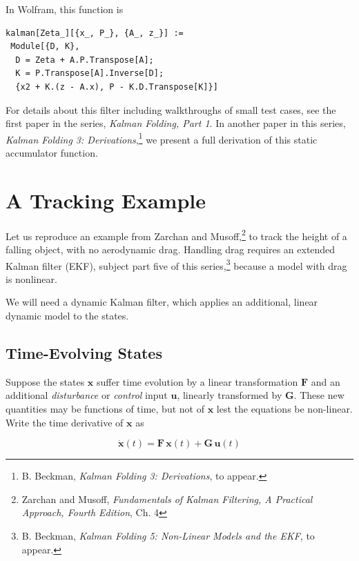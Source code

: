 \documentclass[10pt,oneside,x11names]{article}
\begin{document}
In Wolfram, this function is

\begin{verbatim}
kalman[Zeta_][{x_, P_}, {A_, z_}] :=
 Module[{D, K},
  D = Zeta + A.P.Transpose[A];
  K = P.Transpose[A].Inverse[D];
  {x2 + K.(z - A.x), P - K.D.Transpose[K]}]
\end{verbatim}

For details about this filter including walkthroughs of small test cases, see the first
paper in the series, \emph{Kalman Folding, Part 1}.\footnotemark[1]{}
In another paper in this series, \emph{Kalman Folding 3: Derivations},\footnote{B. Beckman, \emph{Kalman Folding 3: Derivations}, to appear.} we
present a full derivation of this static accumulator function.

\section{A Tracking Example}
\label{sec:orgheadline7}

Let us reproduce an example from Zarchan and Musoff,\footnote{Zarchan and Musoff, \emph{Fundamentals of Kalman Filtering, A Practical
Approach, Fourth Edition}, Ch. 4} to track the
height of a falling object, with no aerodynamic drag. Handling drag requires an
extended Kalman filter (EKF), subject part five of this series,\footnote{B. Beckman, \emph{Kalman Folding 5: Non-Linear Models and the EKF}, to appear.} because
a model with drag is nonlinear.

We will need a dynamic Kalman filter, which applies an additional, linear
dynamic model to the states. 

\subsection{Time-Evolving States}
\label{sec:orgheadline3}

Suppose the states \(\mathbold{x}\) suffer time evolution by a linear
transformation \(\mathbold{F}\) and an additional \emph{disturbance} or \emph{control} input
\(\mathbold{u}\), linearly transformed by \(\mathbold{G}\).
These new quantities may
be functions of time, but not of \(\mathbold{x}\) lest the equations be
non-linear. Write
the time derivative of \(\mathbold{x}\) as

\begin{equation*}
{\dot{\mathbold{x}}}(t)=\mathbold{F}\,\mathbold{x}(t)+\mathbold{G}\,\mathbold{u}(t)
\end{equation*}
\end{document}
